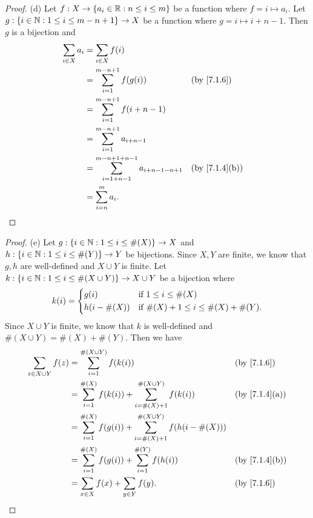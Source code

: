 \begin{proof}{(d)}
  Let \(f : X \to \left\lbrace a_i \in \mathbb{R} : n \leq i \leq m\right\rbrace\) be a function where \(f = i \mapsto a_i\).
  Let \(g : \left\lbrace i \in \mathbb{N} : 1 \leq i \leq m - n + 1\right\rbrace \to X\) be a function where \(g = i \mapsto i + n - 1\).
  Then \(g\) is a bijection and
  \begin{align*}
    \sum_{i \in X} a_i & = \sum_{i \in X} f(i)                                                                             \\
                       & = \sum_{i = 1}^{m - n + 1} f(g(i))                               &  & \by{7.1.6}                  \\
                       & = \sum_{i = 1}^{m - n + 1} f(i + n - 1)                                                           \\
                       & = \sum_{i = 1}^{m - n + 1} a_{i + n - 1}                                                          \\
                       & = \sum_{i = 1 + n - 1}^{m - n + 1 + n - 1} a_{i + n - 1 - n + 1} &  & \text{(by \cref{7.1.4}(b))} \\
                       & = \sum_{i = n}^m a_i.
  \end{align*}
\end{proof}

\begin{proof}{(e)}
  Let \(g : \left\lbrace i \in \mathbb{N} : 1 \leq i \leq \#(X)\right\rbrace \to X\) and \(h : \left\lbrace i \in \mathbb{N} : 1 \leq i \leq \#(Y)\right\rbrace \to Y\) be bijections.
  Since \(X, Y\) are finite, we know that \(g, h\) are well-defined and \(X \cup Y\) is finite.
  Let \(k : \left\lbrace i \in \mathbb{N} : 1 \leq i \leq \#(X \cup Y)\right\rbrace \to X \cup Y\) be a bijection where
  \[
    k(i) = \begin{dcases}
      g(i)         & \text{if } 1 \leq i \leq \#(X)                  \\
      h(i - \#(X)) & \text{if } \#(X) + 1 \leq i \leq \#(X) + \#(Y).
    \end{dcases}
  \]
  Since \(X \cup Y\) is finite, we know that \(k\) is well-defined and \(\#(X \cup Y) = \#(X) + \#(Y)\).
  Then we have
  \begin{align*}
    \sum_{z \in X \cup Y} f(z) & = \sum_{i = 1}^{\#(X \cup Y)} f(k(i))                                                &  & \by{7.1.6}                  \\
                               & = \sum_{i = 1}^{\#(X)} f(k(i)) + \sum_{i = \#(X) + 1}^{\#(X \cup Y)} f(k(i))         &  & \text{(by \cref{7.1.4}(a))} \\
                               & = \sum_{i = 1}^{\#(X)} f(g(i)) + \sum_{i = \#(X) + 1}^{\#(X \cup Y)} f(h(i - \#(X)))                                  \\
                               & = \sum_{i = 1}^{\#(X)} f(g(i)) + \sum_{i = 1}^{\#(Y)} f(h(i))                        &  & \text{(by \cref{7.1.4}(b))} \\
                               & = \sum_{x \in X} f(x) + \sum_{y \in Y} f(y).                                         &  & \by{7.1.6}
  \end{align*}
\end{proof}

